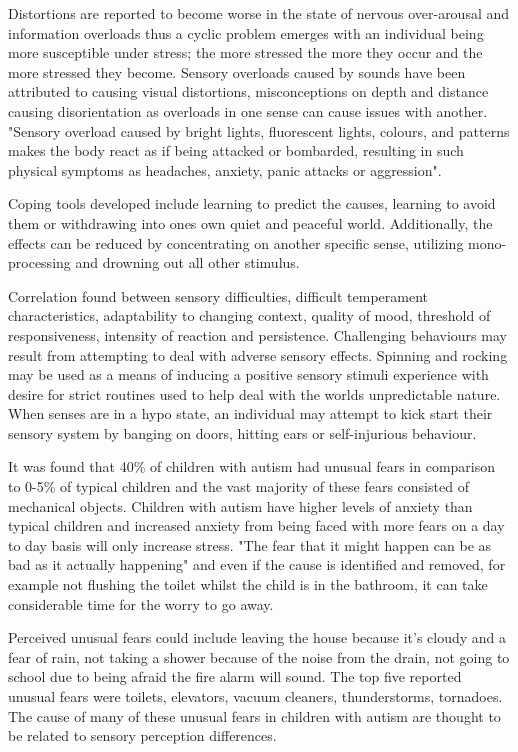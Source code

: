 \documentclass[11pt]{report}
\begin{document}
Distortions are reported to become worse in the state of nervous over-arousal and information overloads\cite{olgab} thus a cyclic problem emerges with an individual being more susceptible under stress; the more stressed the more they occur and the more stressed they become. Sensory overloads caused by sounds have been attributed to causing visual distortions, misconceptions on depth and distance causing disorientation\cite{sensoryexperiences} as overloads in one sense can cause issues with another. "Sensory overload caused by bright lights, fluorescent lights, colours, and patterns makes the body react as if being attacked or bombarded, resulting in such physical symptoms as headaches, anxiety, panic attacks or aggression"\cite{bayes}. 

Coping tools developed include learning to predict the causes, learning to avoid them or withdrawing into ones own quiet and peaceful world. Additionally, the effects can be reduced by concentrating on another specific sense, utilizing mono-processing and drowning out all other stimulus. 

Correlation found between sensory difficulties, difficult temperament characteristics, adaptability to changing context, quality of mood, threshold of responsiveness, intensity of reaction and persistence\cite{temperament}. Challenging behaviours may result from attempting to deal with adverse sensory effects. Spinning and rocking may be used as a means of inducing a positive sensory stimuli experience with desire for strict routines used to help deal with the worlds unpredictable nature\cite{sensory_overview}. When senses are in a hypo state, an individual may attempt to kick start their sensory system by banging on doors, hitting ears or self-injurious behaviour\cite{sensory_overview}. 

It was found that 40\% of children with autism had unusual fears in comparison to 0-5\% of typical children and the vast majority of these fears consisted of mechanical objects. Children with autism have higher levels of anxiety than typical children\cite{fears} and increased anxiety from being faced with more fears on a day to day basis will only increase stress. "The fear that it might happen can be as bad as it actually happening"\cite{fears} and even if the cause is identified and removed, for example not flushing the toilet whilst the child is in the bathroom, it can take considerable time for the worry to go away.

Perceived unusual fears could include leaving the house because it's cloudy and a fear of rain, not taking a shower because of the noise from the drain, not going to school due to being afraid the fire alarm will sound. The top five reported unusual fears were toilets, elevators, vacuum cleaners, thunderstorms, tornadoes. The cause of many of these unusual fears in children with autism are thought to be related to sensory perception differences\cite{fears}.
\end{document}
